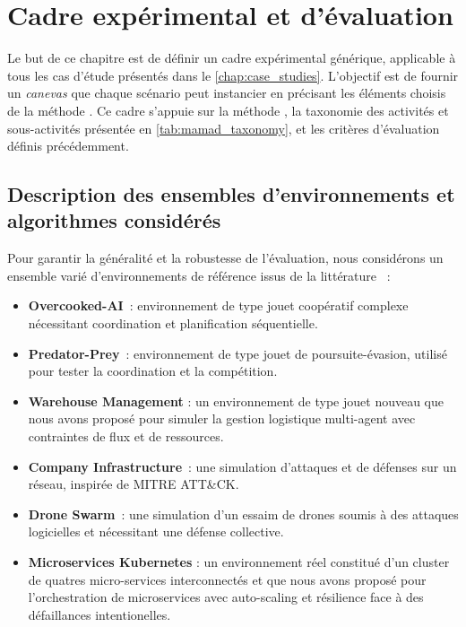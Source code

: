 \clearpage
\thispagestyle{empty}
\null
\newpage


\chapter{Cadre expérimental et d'évaluation}
\label{chap:cadre_experimental}

Le but de ce chapitre est de définir un cadre expérimental générique, applicable à tous les cas d'étude présentés dans le \autoref{chap:case_studies}. L'objectif est de fournir un \textit{canevas} que chaque scénario peut instancier en précisant les éléments choisis de la méthode . Ce cadre s'appuie sur la méthode , la taxonomie des activités et sous-activités présentée en \autoref{tab:mamad_taxonomy}, et les critères d'évaluation définis précédemment.

\section{Description des ensembles d'environnements et algorithmes considérés}

Pour garantir la généralité et la robustesse de l'évaluation, nous considérons un ensemble varié d'environnements de référence issus de la littérature ~:
\begin{itemize}
  \item \textbf{Overcooked-AI}~\cite{overcookedai}: environnement de type jouet coopératif complexe nécessitant coordination et planification séquentielle.
  \item \textbf{Predator-Prey}~\cite{lowe2017multi}: environnement  de type jouet de poursuite-évasion, utilisé pour tester la coordination et la compétition.
  \item \textbf{Warehouse Management} : un environnement  de type jouet nouveau que nous avons proposé pour simuler la gestion logistique multi-agent avec contraintes de flux et de ressources.
  \item \textbf{Company Infrastructure}~\cite{cyberbattlesim}: une simulation d'attaques et de défenses sur un réseau, inspirée de MITRE ATT\&CK.
  \item \textbf{Drone Swarm}~\cite{cage_challenge_3_announcement}: une simulation d'un essaim de drones soumis à des attaques logicielles et nécessitant une défense collective.
  \item \textbf{Microservices Kubernetes} : un environnement réel constitué d'un cluster de quatres micro-services interconnectés et que nous avons proposé pour l'orchestration de microservices avec auto-scaling et résilience face à des défaillances intentionelles.
\end{itemize}

